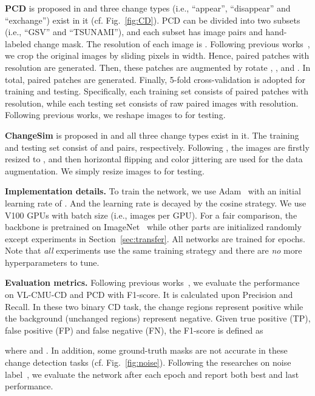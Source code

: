 \documentclass[review]{elsarticle}
\begin{document}
\textbf{PCD} is proposed in \cite{PCD} and three change types (i.e., ``appear'', ``disappear'' and ``exchange'') exist in it (cf. Fig.~\ref{fig:CD}). PCD can be divided into two subsets (i.e., ``GSV'' and ``TSUNAMI''), and each subset has  image pairs and hand-labeled change mask. The resolution of each image is . Following previous works~\cite{DR_TANet,HPCFNet}, we crop the original images by sliding  pixels in width. Hence,  paired patches with  resolution are generated. Then, these patches are augmented by rotate , ,  and . In total,  paired patches are generated. Finally, 5-fold cross-validation is adopted for training and testing. Specifically, each training set consists of  paired patches with  resolution, while each testing set consists of  raw paired images with  resolution. Following previous works, we reshape images to  for testing. 

\textbf{ChangeSim} is proposed in \cite{changesim} and all three change types exist in it. The training and testing set consist of  and  pairs, respectively. Following \cite{changesim}, the images are firstly resized to , and then horizontal flipping and color jittering are used for the data augmentation. We simply resize images to  for testing.

\textbf{Implementation details.} To train the network, we use Adam~\cite{Adam} with an initial learning rate of . And the learning rate is decayed by the cosine strategy. We use  V100 GPUs with batch size  (i.e.,  images per GPU). For a fair comparison, the backbone is pretrained on ImageNet~\cite{imagenet} while other parts are initialized randomly except experiments in Section~\ref{sec:transfer}. All networks are trained for  epochs. Note that \emph{all} experiments use the same training strategy and there are \emph{no} more hyperparameters to tune.

\textbf{Evaluation metrics.} Following previous works~\cite{DR_TANet,HPCFNet}, we evaluate the performance on VL-CMU-CD and PCD with F1-score. It is calculated upon Precision and Recall. In these two binary CD task, the change regions represent positive while the background (unchanged regions) represent negative. Given true positive (TP), false positive (FP) and false negative (FN), the F1-score is defined as

where  and . In addition, some ground-truth masks are not accurate in these change detection tasks (cf. Fig.~\ref{fig:noise}). Following the researches on noise label~\cite{PENCIL,dividemix}, we evaluate the network after each epoch and report both best and last performance. 
\end{document}
